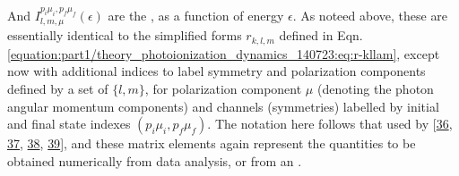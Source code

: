 \documentclass[letterpaper,table,10pt,english]{jupyterBook}
\begin{document}
\sphinxAtStartPar
And \(I_{l,m,\mu}^{p_{i}\mu_{i},p_{f}\mu_{f}}(\epsilon)\) are the {\hyperref[\detokenize{backmatter/glossary:term-radial-matrix-elements}]{}}, as a function of energy \(\epsilon\).
As noteed above, these {\hyperref[\detokenize{backmatter/glossary:term-radial-matrix-elements}]{}} are essentially identical to the simplified forms
\(r_{k,l,m}\) defined in Eqn. \eqref{equation:part1/theory_photoionization_dynamics_140723:eq:r-kllam}, except now with additional indices to label
symmetry and polarization components defined by a set of {\hyperref[\detokenize{backmatter/glossary:term-partial-waves}]{}}
\(\{l,m\}\), for polarization component \(\mu\) (denoting the photon angular
momentum components) and channels (symmetries) labelled by initial and
final state indexes \((p_{i}\mu_{i},p_{f}\mu_{f})\). The notation here
follows that used by  {[}\hyperlink{cite.backmatter/bibliography:id763}{36}, \hyperlink{cite.backmatter/bibliography:id627}{37}, \hyperlink{cite.backmatter/bibliography:id804}{38}, \hyperlink{cite.backmatter/bibliography:id766}{39}{]}, and these matrix elements again represent the quantities to be obtained numerically from data analysis, or from an .
\end{document}
